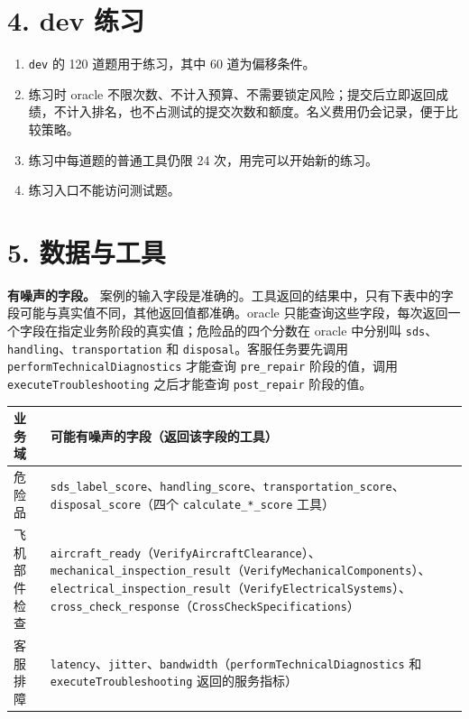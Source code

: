 \documentclass[11pt,a4paper]{article}
\newcounter{none} %
\providecommand{\tightlist}{\setlength{\itemsep}{3pt}\setlength{\parskip}{0pt}}
\begin{document}
\section{4. dev 练习}\label{dev-ux7ec3ux4e60}

\begin{enumerate}
\def\labelenumi{\arabic{enumi}.}
\tightlist
\item
  \texttt{dev} 的 120 道题用于练习，其中 60 道为偏移条件。
\item
  练习时 oracle
  不限次数、不计入预算、不需要锁定风险；提交后立即返回成绩，不计入排名，也不占测试的提交次数和额度。名义费用仍会记录，便于比较策略。
\item
  练习中每道题的普通工具仍限 24 次，用完可以开始新的练习。
\item
  练习入口不能访问测试题。
\end{enumerate}

\section{5. 数据与工具}\label{ux6570ux636eux4e0eux5de5ux5177}

\textbf{有噪声的字段。}
案例的输入字段是准确的。工具返回的结果中，只有下表中的字段可能与真实值不同，其他返回值都准确。oracle
只能查询这些字段，每次返回一个字段在指定业务阶段的真实值；危险品的四个分数在
oracle 中分别叫 \texttt{sds}、\texttt{handling}、\texttt{transportation}
和 \texttt{disposal}。客服任务要先调用
\texttt{performTechnicalDiagnostics} 才能查询 \texttt{pre\_repair}
阶段的值，调用 \texttt{executeTroubleshooting} 之后才能查询
\texttt{post\_repair} 阶段的值。

{\small{} %
\begin{longtable}[]{@{}
  >{\raggedright\arraybackslash}p{}
  >{\raggedright\arraybackslash}p{}@{}}
\toprule\noalign{}
\begin{minipage}[b]{\linewidth}\raggedright
业务域
\end{minipage} & \begin{minipage}[b]{\linewidth}\raggedright
可能有噪声的字段（返回该字段的工具）
\end{minipage} \\
\midrule\noalign{}
\endhead
\bottomrule\noalign{}
\endlastfoot
危险品 &
\texttt{sds\_label\_score}、\texttt{handling\_score}、\texttt{transportation\_score}、\texttt{disposal\_score}（四个
\texttt{calculate\_*\_score} 工具） \\
飞机部件检查 &
\texttt{aircraft\_ready}（\texttt{VerifyAircraftClearance}）、\texttt{mechanical\_inspection\_result}（\texttt{VerifyMechanicalComponents}）、\texttt{electrical\_inspection\_result}（\texttt{VerifyElectricalSystems}）、\texttt{cross\_check\_response}（\texttt{CrossCheckSpecifications}） \\
客服排障 &
\texttt{latency}、\texttt{jitter}、\texttt{bandwidth}（\texttt{performTechnicalDiagnostics}
和 \texttt{executeTroubleshooting} 返回的服务指标） \\
\end{longtable}
}
\end{document}
